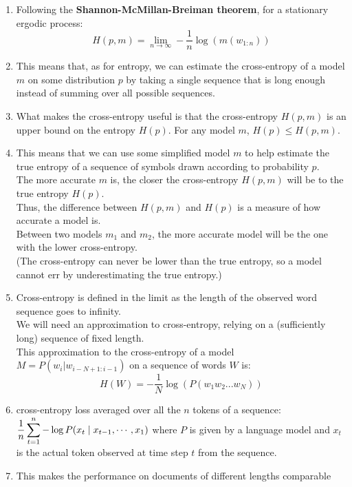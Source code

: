 \begin{enumerate}[itemsep=0.2cm]
    \item Following the \textbf{Shannon-McMillan-Breiman theorem}, for a stationary ergodic process:
    \[
        H(p,m) = \lim_{n \rightarrow \infty} - \dfrac{1}{n}\log(m(w_{1:n}))
    \]
    
    \item This means that, as for entropy, we can estimate the cross-entropy of a model $m$ on some distribution $p$ by taking a single sequence that is long enough instead of summing over all possible sequences.

    \item What makes the cross-entropy useful is that the cross-entropy $H(p,m)$ is an upper bound on the entropy $H(p)$. For any model $m$, \(H(p) \leq H(p,m)\).

    \item This means that we can use some simplified model $m$ to help estimate the true entropy of a sequence of symbols drawn according to probability $p$.\\
    The more accurate $m$ is, the closer the cross-entropy $H(p,m)$ will be to the true entropy $H(p)$.\\
    Thus, the difference between $H(p,m)$ and $H(p)$ is a measure of how accurate a model is.\\
    Between two models $m_1$ and $m_2$, the more accurate model will be the one with the lower cross-entropy.\\
    (The cross-entropy can never be lower than the true entropy, so a model cannot err by underestimating the true entropy.)

    \item Cross-entropy is defined in the limit as the length of the observed word sequence goes to infinity.\\
    We will need an approximation to cross-entropy, relying on a (sufficiently long) sequence of fixed length.\\
    This approximation to the cross-entropy of a model $M = P(w_i|w_{i-N+1:i-1})$ on a sequence of words $W$ is:
    \[
        H(W) = -\dfrac{1}{N}\log(P(w_1w_2...w_N))
    \]

    \item cross-entropy loss averaged over all the $n$ tokens of a sequence: $
        \dfrac{1}{n} \displaystyle\sum_{t=1}^n -\log P(x_t \mid x_{t-1}, \cdots, x_1)
    $ where $P$ is given by a language model and $x_t$ is the actual token observed at time step $t$ from the sequence. \hfill \cite{dnn-1}

    \item This makes the performance on documents of different lengths comparable

\end{enumerate}




